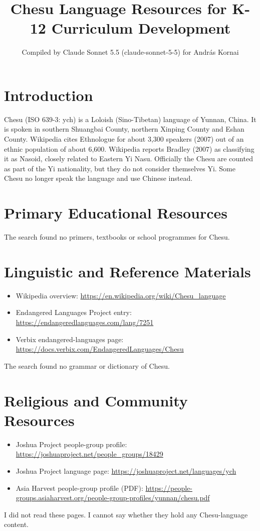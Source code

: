 \documentclass[12pt]{article}
\title{Chesu Language Resources for K-12 Curriculum Development}
\author{Compiled by Claude Sonnet 5.5 (claude-sonnet-5-5) for Andr\'as Kornai}
\date{}
\begin{document}
\maketitle

\section{Introduction}
Chesu (ISO 639-3: ych) is a Loloish (Sino-Tibetan) language of Yunnan, China. It is spoken in southern Shuangbai County, northern Xinping County and Eshan County. Wikipedia cites Ethnologue for about 3,300 speakers (2007) out of an ethnic population of about 6,600. Wikipedia reports Bradley (2007) as classifying it as Nasoid, closely related to Eastern Yi Nasu. Officially the Chesu are counted as part of the Yi nationality, but they do not consider themselves Yi. Some Chesu no longer speak the language and use Chinese instead.

\section{Primary Educational Resources}
The search found no primers, textbooks or school programmes for Chesu.

\section{Linguistic and Reference Materials}
\begin{itemize}
\item Wikipedia overview: \url{https://en.wikipedia.org/wiki/Chesu_language}
\item Endangered Languages Project entry: \url{https://endangeredlanguages.com/lang/7251}
\item Verbix endangered-languages page: \url{https://docs.verbix.com/EndangeredLanguages/Chesu}
\end{itemize}
The search found no grammar or dictionary of Chesu.

\section{Religious and Community Resources}
\begin{itemize}
\item Joshua Project people-group profile: \url{https://joshuaproject.net/people_groups/18429}
\item Joshua Project language page: \url{https://joshuaproject.net/languages/ych}
\item Asia Harvest people-group profile (PDF): \url{https://people-groups.asiaharvest.org/people-group-profiles/yunnan/chesu.pdf}
\end{itemize}
I did not read these pages. I cannot say whether they hold any Chesu-language content.
\end{document}
